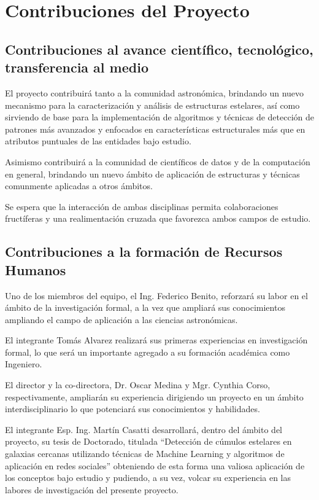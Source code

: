 \documentclass[
	11pt,oneside,a4paper,
	fleqn,
	article
]{memoir}
\begin{document}
\section{Contribuciones del Proyecto}

\subsection{Contribuciones al avance científico, tecnológico, transferencia al medio}

El proyecto contribuirá tanto a la comunidad astronómica, brindando un nuevo mecanismo para la caracterización y análisis de estructuras estelares, así como sirviendo de base para la implementación de algoritmos y técnicas de detección de patrones más avanzados y enfocados en características estructurales más que en atributos puntuales de las entidades bajo estudio.

Asimismo contribuirá a la comunidad de científicos de datos y de la computación en general, brindando un nuevo ámbito de aplicación de estructuras y técnicas comunmente aplicadas a otros ámbitos. 

Se espera que la interacción de ambas disciplinas permita colaboraciones fructíferas y una realimentación cruzada que favorezca ambos campos de estudio.

\subsection{Contribuciones a la formación de Recursos Humanos}

Uno de los miembros del equipo, el Ing. Federico Benito, reforzará su labor en el ámbito de la investigación formal, a la vez que ampliará sus conocimientos ampliando el campo de aplicación a las ciencias astronómicas.

El integrante Tomás Alvarez realizará sus primeras experiencias en investigación formal, lo que será un importante agregado a su formación académica como Ingeniero.

El director y la co-directora, Dr. Oscar Medina y Mgr. Cynthia Corso, respectivamente, ampliarán su experiencia dirigiendo un proyecto en un ámbito interdisciplinario lo que potenciará sus conocimientos y habilidades.

El integrante Esp. Ing. Martín Casatti desarrollará, dentro del ámbito del proyecto, su tesis de Doctorado, titulada ``Detección de cúmulos estelares en galaxias cercanas utilizando técnicas de Machine Learning y algoritmos de aplicación en redes sociales'' obteniendo de esta forma una valiosa aplicación de los conceptos bajo estudio y pudiendo, a su vez, volcar su experiencia en las labores de investigación del presente proyecto.
\end{document}
